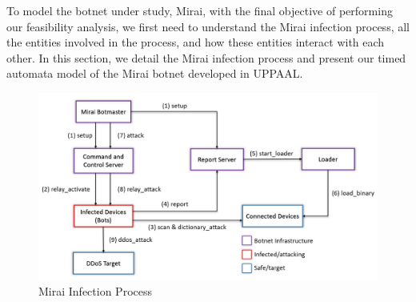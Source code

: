 To model the botnet under study, Mirai, with the final objective of performing our feasibility analysis, we first need to understand the Mirai infection process, all the entities involved in the process, and how these entities interact with each other. In this section, we detail the Mirai infection process and present our timed automata model of the Mirai botnet developed in UPPAAL.
\begin{figure}[h!]
    \centering
    \includegraphics[width=\linewidth]{Figures/mirai_infection_process.jpg}
    \caption{Mirai Infection Process}
    \vspace{-0.2 cm}
    \label{fig:mirai_infection_process}
\end{figure}
\par


